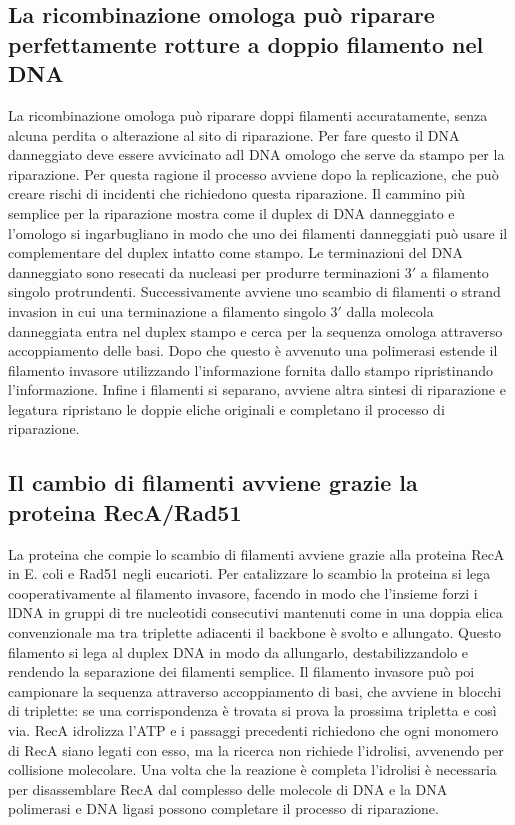 \subsection{La ricombinazione omologa pu\`o riparare perfettamente rotture a doppio filamento nel DNA}
La ricombinazione omologa pu\`o riparare doppi filamenti accuratamente, senza alcuna perdita o alterazione al sito di riparazione. Per fare questo il DNA danneggiato deve essere 
avvicinato adl DNA omologo che serve da stampo per la riparazione. Per questa ragione il processo avviene dopo la replicazione, che pu\`o creare rischi di incidenti che richiedono questa
riparazione. Il cammino pi\`u semplice per la riparazione mostra come il duplex di DNA danneggiato e l'omologo si ingarbugliano in modo che uno dei filamenti danneggiati pu\`o usare il 
complementare del duplex intatto come stampo. Le terminazioni del DNA danneggiato sono resecati da nucleasi per produrre terminazioni $3'$ a filamento singolo protrundenti. 
Successivamente avviene uno scambio di filamenti o strand invasion in cui una terminazione a filamento singolo $3'$ dalla molecola danneggiata entra nel duplex stampo e cerca per la 
sequenza omologa attraverso accoppiamento delle basi. Dopo che questo \`e avvenuto una polimerasi estende il filamento invasore utilizzando l'informazione fornita dallo stampo 
ripristinando l'informazione. Infine i filamenti si separano, avviene altra sintesi di riparazione e legatura ripristano le doppie eliche originali e completano il processo di 
riparazione. 
\subsection{Il cambio di filamenti avviene grazie la proteina RecA/Rad51}
La proteina che compie lo scambio di filamenti avviene grazie alla proteina RecA in E. coli e Rad51 negli eucarioti. Per catalizzare lo scambio la proteina si lega cooperativamente
al filamento invasore, facendo in modo che l'insieme forzi i lDNA in gruppi di tre nucleotidi consecutivi mantenuti come in una doppia elica convenzionale ma tra triplette adiacenti
il backbone \`e svolto e allungato. Questo filamento si lega al duplex DNA in modo da allungarlo, destabilizzandolo e rendendo la separazione dei filamenti semplice. Il filamento 
invasore pu\`o poi campionare la sequenza attraverso accoppiamento di basi, che avviene in blocchi di triplette: se una corrispondenza \`e trovata si prova la prossima tripletta e cos\`i
via. RecA idrolizza l'ATP e i passaggi precedenti richiedono che ogni monomero di RecA siano legati con esso, ma la ricerca non richiede l'idrolisi, avvenendo per collisione molecolare.
Una volta che la reazione \`e completa l'idrolisi \`e necessaria per disassemblare RecA dal complesso delle molecole di DNA e la DNA polimerasi e DNA ligasi possono completare il 
processo di riparazione.
